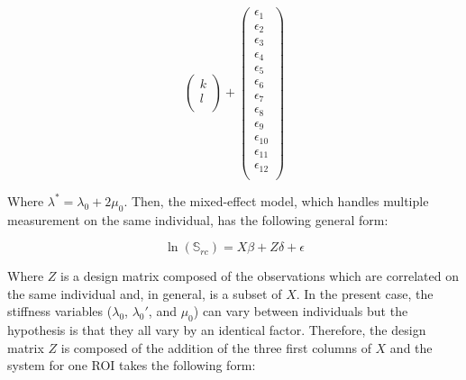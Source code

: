 \documentclass[a4paper,fleqn]{DC_ArtStyle}
\begin{document}
\begin{equation}
\begin{pmatrix}
		k \\
		l \\
	\end{pmatrix} + \begin{pmatrix}
		\epsilon_{1} \\
		\epsilon_{2} \\
		\epsilon_{3} \\
		\epsilon_{4} \\
		\epsilon_{5} \\
		\epsilon_{6} \\
		\epsilon_{7} \\
		\epsilon_{8} \\
		\epsilon_{9} \\
		\epsilon_{10} \\
		\epsilon_{11} \\
		\epsilon_{12} \\
	\end{pmatrix}
\end{equation}

Where $\lambda^{*} = \lambda_0 + 2\mu_0$. Then, the mixed-effect model, which handles multiple measurement on the same individual, has the following general form:

\begin{equation}
	\ln(\mathbb{S}_{rc}) = X \beta + Z \delta + \epsilon
\end{equation}

Where $Z$ is a design matrix composed of the observations which are correlated on the same individual and, in general, is a subset of $X$. In the present case, the stiffness variables ($\lambda_0$, $\lambda_0'$, and $\mu_0$) can vary between individuals but the hypothesis is that they all vary by an identical factor. Therefore, the design matrix $Z$ is composed of the addition of the three first columns of $X$ and the system for one ROI takes the following form:
\end{document}
